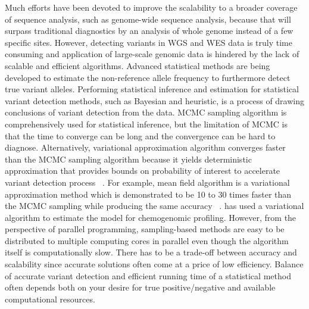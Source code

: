 \documentclass[11pt,reqno]{amsart}
\begin{document}
Much efforts have been devoted to improve the scalability to a broader coverage of sequence analysis, such as genome-wide sequence analysis, because that will surpass traditional diagnostics by an analysis of whole genome instead of a few specific sites.
However, detecting variants in WGS and WES data is truly time consuming and application of large-scale genomic data is hindered by the lack of scalable and efficient algorithms.
Advanced statistical methods are being developed to estimate the non-reference allele frequency to furthermore detect true variant alleles.
Performing statistical inference and estimation for statistical variant detection methods, such as Bayesian and heuristic, is a process of drawing conclusions of variant detection from the data. 
MCMC sampling algorithm is comprehensively used for statistical inference, but the limitation of MCMC is that the time to converge can be long and the convergence can be hard to diagnose.
Alternatively, variational approximation algorithm converges faster than the MCMC sampling algorithm because it yields deterministic approximation that provides bounds on probability of interest to accelerate variant detection process ~\citep{jordan1999introduction}.
For example, mean field algorithm is a variational approximation method which is demonstrated to be 10 to 30 times faster than the MCMC sampling while producing the same accuracy ~\citep{peterson1989explorations}.
\citet{flaherty2005latent} has used a variational algorithm to estimate the model for chemogenomic profiling.
However, from the perspective of parallel programming, sampling-based methods are easy to be distributed to multiple computing cores in parallel even though the algorithm itself is computationally slow.
There has to be a trade-off between accuracy and scalability since accurate solutions often come at a price of low efficiency.
Balance of accurate variant detection and efficient running time of a statistical method often depends both on your desire for true positive/negative and available computational resources.


\end{document}
